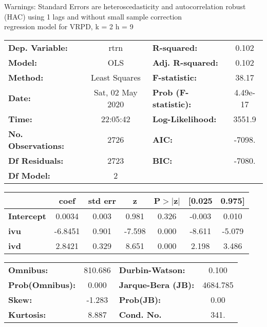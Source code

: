 Warnings: \newline
 [1] Standard Errors are heteroscedasticity and autocorrelation robust (HAC) using 1 lags and without small sample correction\\ 

regression model for VRPD, k = 2 h = 9\begin{center}
\begin{tabular}{lclc}
\toprule
\textbf{Dep. Variable:}    &       rtrn       & \textbf{  R-squared:         } &     0.102   \\
\textbf{Model:}            &       OLS        & \textbf{  Adj. R-squared:    } &     0.102   \\
\textbf{Method:}           &  Least Squares   & \textbf{  F-statistic:       } &     38.17   \\
\textbf{Date:}             & Sat, 02 May 2020 & \textbf{  Prob (F-statistic):} &  4.49e-17   \\
\textbf{Time:}             &     22:05:42     & \textbf{  Log-Likelihood:    } &    3551.9   \\
\textbf{No. Observations:} &        2726      & \textbf{  AIC:               } &    -7098.   \\
\textbf{Df Residuals:}     &        2723      & \textbf{  BIC:               } &    -7080.   \\
\textbf{Df Model:}         &           2      & \textbf{                     } &             \\
\bottomrule
\end{tabular}
\begin{tabular}{lcccccc}
                   & \textbf{coef} & \textbf{std err} & \textbf{z} & \textbf{P$> |$z$|$} & \textbf{[0.025} & \textbf{0.975]}  \\
\midrule
\textbf{Intercept} &       0.0034  &        0.003     &     0.981  &         0.326        &       -0.003    &        0.010     \\
\textbf{ivu}       &      -6.8451  &        0.901     &    -7.598  &         0.000        &       -8.611    &       -5.079     \\
\textbf{ivd}       &       2.8421  &        0.329     &     8.651  &         0.000        &        2.198    &        3.486     \\
\bottomrule
\end{tabular}
\begin{tabular}{lclc}
\textbf{Omnibus:}       & 810.686 & \textbf{  Durbin-Watson:     } &    0.100  \\
\textbf{Prob(Omnibus):} &   0.000 & \textbf{  Jarque-Bera (JB):  } & 4684.785  \\
\textbf{Skew:}          &  -1.283 & \textbf{  Prob(JB):          } &     0.00  \\
\textbf{Kurtosis:}      &   8.887 & \textbf{  Cond. No.          } &     341.  \\
\bottomrule
\end{tabular}
\end{center}

